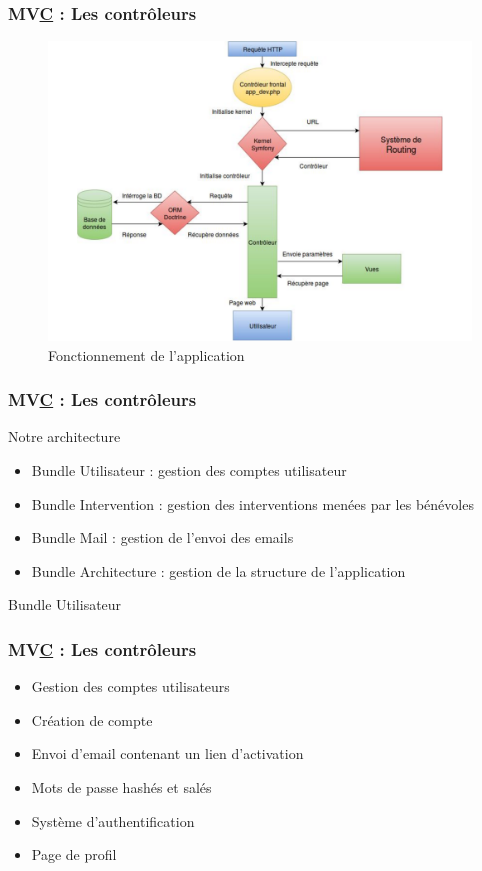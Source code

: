 
\begin{frame}
  \frametitle{MV\underline{C} : Les contrôleurs}
        \begin{figure}[!h]
	\begin{center}
	\includegraphics[scale=0.3]{images/symfony}
	\caption{Fonctionnement de l'application}
	\end{center}
\end{figure}
\end{frame}


\begin{frame}
  \frametitle{MV\underline{C} : Les contrôleurs}
  \begin{block}{Notre architecture}
  \begin{itemize}
  \item Bundle Utilisateur : gestion des comptes utilisateur
  \item Bundle Intervention : gestion des interventions menées par les bénévoles
  \item Bundle Mail : gestion de l'envoi des emails
  \item Bundle Architecture : gestion de la structure de l'application
  \end{itemize}
  \end{block}   
  \end{frame}


\begin{frame}
\begin{block}{Bundle Utilisateur}
\frametitle{MV\underline{C} : Les contrôleurs}
\begin{itemize}
\item Gestion des comptes utilisateurs
\item Création de compte
\item Envoi d'email contenant un lien d'activation
\item Mots de passe hashés et salés
\item Système d'authentification
\item Page de profil 
\end{itemize}
\end{block}
\end{frame}

